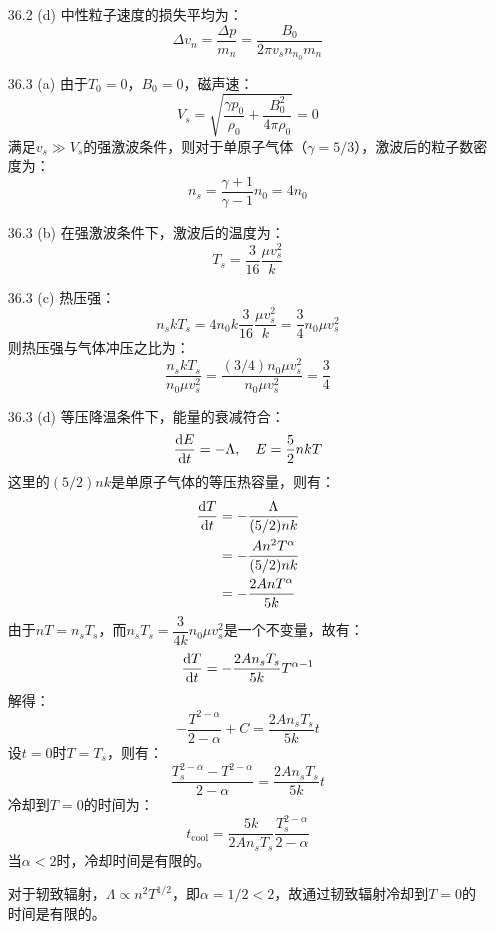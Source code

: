 \documentclass[a4paper,fontset=none]{ctexart}
\begin{document}
\begin{enumerate}
    \medskip
    \item[36.2 (d)]
    中性粒子速度的损失平均为：
    \[
        \Delta v_n = \frac{\Delta p}{m_n} = \frac{B_0}{2\pi v_s n_{n_0} m_n}
    \]

    \bigskip
    \item[36.3 (a)]
    由于$T_0 = 0$，$B_0 = 0$，磁声速：
    \[
        V_s = \sqrt{\frac{\gamma p_0}{\rho_0} + \frac{B_0^2}{4\pi \rho_0}} = 0
    \]
    满足$v_s \gg V_s$的强激波条件，则对于单原子气体（$\gamma = 5/3$），激波后的粒子数密度为：
    \[
        n_s = \frac{\gamma + 1}{\gamma - 1}n_0 = 4n_0
    \]

    \medskip
    \item[36.3 (b)]
    在强激波条件下，激波后的温度为：
    \[
        T_s = \frac{3}{16} \frac{\mu v_s^2}{k}
    \]

    \medskip
    \item[36.3 (c)]
    热压强：
    \[
        n_s kT_s = 4n_0 k \frac{3}{16} \frac{\mu v_s^2}{k} = \frac{3}{4} n_0\mu v_s^2
    \]
    则热压强与气体冲压之比为：
    \[
        \frac{n_s kT_s}{n_0\mu v_s^2} = \frac{(3/4) n_0\mu v_s^2}{n_0\mu v_s^2} = \frac{3}{4}
    \]

    \bigskip
    \item[36.3 (d)]
    等压降温条件下，能量的衰减符合：
    \[
        \odv{E}{t} = -\Lambda,\quad E = \frac{5}{2}nkT
    \]
    这里的$(5/2)nk$是单原子气体的等压热容量，则有：
    \begin{align*}
        \odv{T}{t}
        &= -\frac{\Lambda}{(5/2)nk} \\
        &= -\frac{An^2 T^\alpha}{(5/2)nk} \\
        &= -\frac{2AnT^\alpha}{5k}
    \end{align*}
    由于$nT = n_s T_s$，而$n_s T_s = \dfrac{3}{4k} n_0\mu v_s^2$是一个不变量，故有：
    \[
        \odv{T}{t} = -\frac{2An_s T_s}{5k} T^{\alpha-1}
    \]
    解得：
    \[
        -\frac{T^{2-\alpha}}{2-\alpha} + C = \frac{2An_s T_s}{5k}t
    \]
    设$t = 0$时$T = T_s$，则有：
    \[
        \frac{T_s^{2-\alpha} - T^{2-\alpha}}{2-\alpha} = \frac{2An_s T_s}{5k} t
    \]
    冷却到$T = 0$的时间为：
    \[
        t_{\mathrm{cool}} = \frac{5k}{2An_s T_s} \frac{T_s^{2-\alpha}}{2-\alpha}
    \]
    当$\alpha < 2$时，冷却时间是有限的。

    对于轫致辐射，$\Lambda \propto n^2 T^{1/2}$，即$\alpha = 1/2 < 2$，故通过韧致辐射冷却到$T = 0$的时间是有限的。


\end{enumerate}
\end{document}
